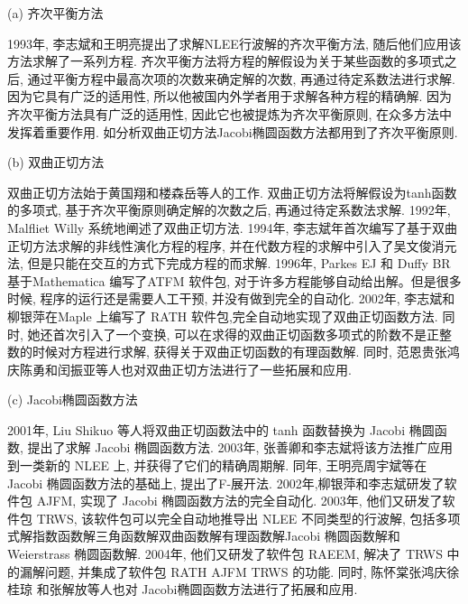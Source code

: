 (a) 齐次平衡方法

1993年, 李志斌和王明亮\cite{zhibin1993travelling}提出了求解NLEE行波解的齐次平衡方法, 随后他们应用该方法求解了一系列方程\cite{wang1995solitary,wang1996application}. 齐次平衡方法将方程的解假设为关于某些函数的多项式之后, 通过平衡方程中最高次项的次数来确定解的次数, 再通过待定系数法进行求解. 因为它具有广泛的适用性, 所以他被国内外学者用于求解各种方程的精确解\cite{hbm1998,hbm1998b,hbm1999,senthilvelan2001extended,zhao2002new,feng2004comment,rady2010homogeneous,eslami2014exact,nguyen2015modified}. 因为齐次平衡方法具有广泛的适用性, 因此它也被提炼为齐次平衡原则, 在众多方法中发挥着重要作用. 如\Painleve{}分析\D 双曲正切方法\D Jacobi椭圆函数方法都用到了齐次平衡原则. 

(b) 双曲正切方法 

双曲正切方法始于黄国翔和楼森岳等人\cite{huang1989exact}的工作. 双曲正切方法将解假设为tanh函数的多项式, 基于齐次平衡原则确定解的次数之后, 再通过待定系数法求解. 1992年, Malfliet Willy \cite{malfliet1992solitary}系统地阐述了双曲正切方法. 1994年, 李志斌\cite{li_book_2007}年首次编写了基于双曲正切方法求解的非线性演化方程的程序, 并在代数方程的求解中引入了吴文俊消元法, 但是只能在交互的方式下完成方程的而求解. 1996年, Parkes EJ 和 Duffy BR \cite{parkes1996automated}基于Mathematica 编写了ATFM 软件包, 对于许多方程能够自动给出解。但是很多时候, 程序的运行还是需要人工干预, 并没有做到完全的自动化. 2002年, 李志斌和柳银萍\cite{liu2001master,li2002rath}在Maple 上编写了 RATH 软件包,完全自动地实现了双曲正切函数方法. 同时, 她还首次引入了一个变换, 可以在求得的双曲正切函数多项式的阶数不是正整数的时候对方程进行求解, 获得关于双曲正切函数的有理函数解. 同时, 范恩贵\cite{fan2000extended}\D 张鸿庆\D 陈勇\cite{zheng2003generalized}和闰振亚\cite{yan2001new}等人也对双曲正切方法进行了一些拓展和应用. 

(c) Jacobi椭圆函数方法

2001年, Liu Shikuo 等人\cite{liu2001jacobi}将双曲正切函数法中的 tanh 函数替换为 Jacobi 椭圆函数, 提出了求解 Jacobi 椭圆函数方法. 2003年, 张善卿和李志斌\cite{zhang2003jacobi}将该方法推广应用到一类新的 NLEE 上, 并获得了它们的精确周期解. 同年, 王明亮\D 周宇斌等\cite{zhou2003periodic}在 Jacobi 椭圆函数方法的基础上, 提出了F-展开法. 2002年,柳银萍和李志斌\cite{yin2002automated}研发了软件包 AJFM, 实现了 Jacobi 椭圆函数方法的完全自动化. 2003年, 他们\cite{yin2003automated}又研发了软件包 TRWS, 该软件包可以完全自动地推导出 NLEE 不同类型的行波解, 包括多项式解\D 指数函数解\D 三角函数解\D 双曲函数解\D 有理函数解\D Jacobi 椭圆函数解和 Weierstrass 椭圆函数解. 2004年, 他们\cite{li2004raeem}又研发了软件包 RAEEM, 解决了 TRWS 中的漏解问题, 并集成了软件包 RATH \D AJFM \D TRWS 的功能. 同时, 陈怀棠\cite{chen2003improved}\D 张鸿庆\cite{wang2005new}\D 徐桂琼\cite{gui2005applications} 和张解放\cite{chao2005symbolic}等人也对 Jacobi椭圆函数方法进行了拓展和应用. 

